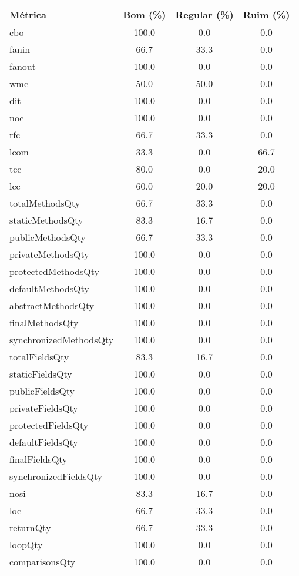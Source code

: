 \begin{tabular}{lccc}
                \toprule
                \textbf{Métrica} & \textbf{Bom (\%)} & \textbf{Regular (\%)} & \textbf{Ruim (\%)} \\
                \midrule
                cbo & 100.0 & 0.0 & 0.0 \\
fanin & 66.7 & 33.3 & 0.0 \\
fanout & 100.0 & 0.0 & 0.0 \\
wmc & 50.0 & 50.0 & 0.0 \\
dit & 100.0 & 0.0 & 0.0 \\
noc & 100.0 & 0.0 & 0.0 \\
rfc & 66.7 & 33.3 & 0.0 \\
lcom & 33.3 & 0.0 & 66.7 \\
tcc & 80.0 & 0.0 & 20.0 \\
lcc & 60.0 & 20.0 & 20.0 \\
totalMethodsQty & 66.7 & 33.3 & 0.0 \\
staticMethodsQty & 83.3 & 16.7 & 0.0 \\
publicMethodsQty & 66.7 & 33.3 & 0.0 \\
privateMethodsQty & 100.0 & 0.0 & 0.0 \\
protectedMethodsQty & 100.0 & 0.0 & 0.0 \\
defaultMethodsQty & 100.0 & 0.0 & 0.0 \\
abstractMethodsQty & 100.0 & 0.0 & 0.0 \\
finalMethodsQty & 100.0 & 0.0 & 0.0 \\
synchronizedMethodsQty & 100.0 & 0.0 & 0.0 \\
totalFieldsQty & 83.3 & 16.7 & 0.0 \\
staticFieldsQty & 100.0 & 0.0 & 0.0 \\
publicFieldsQty & 100.0 & 0.0 & 0.0 \\
privateFieldsQty & 100.0 & 0.0 & 0.0 \\
protectedFieldsQty & 100.0 & 0.0 & 0.0 \\
defaultFieldsQty & 100.0 & 0.0 & 0.0 \\
finalFieldsQty & 100.0 & 0.0 & 0.0 \\
synchronizedFieldsQty & 100.0 & 0.0 & 0.0 \\
nosi & 83.3 & 16.7 & 0.0 \\
loc & 66.7 & 33.3 & 0.0 \\
returnQty & 66.7 & 33.3 & 0.0 \\
loopQty & 100.0 & 0.0 & 0.0 \\
comparisonsQty & 100.0 & 0.0 & 0.0 \\

\end{tabular}
